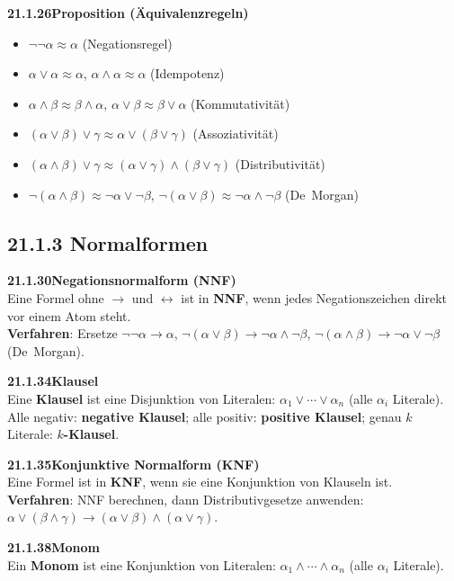 \documentclass[a4paper,12pt]{article}
\newcommand{\gentry}[3]{%
  \noindent\textbf{#1\quad #2}\nopagebreak\\[0.2em]
  #3\par\smallskip
}
\begin{document}
\gentry{21.1.26}{Proposition (Äquivalenzregeln)}{%
  \begin{itemize}[topsep=2pt,itemsep=1pt]
    \item $\lnot\lnot\alpha \approx \alpha$ \hfill (Negationsregel)
    \item $\alpha \lor \alpha \approx \alpha$,\; $\alpha \land \alpha \approx \alpha$ \hfill (Idempotenz)
    \item $\alpha \land \beta \approx \beta \land \alpha$,\;
          $\alpha \lor \beta \approx \beta \lor \alpha$ \hfill (Kommutativität)
    \item $(\alpha \lor \beta) \lor \gamma \approx \alpha \lor (\beta \lor \gamma)$ \hfill (Assoziativität)
    \item $(\alpha \land \beta) \lor \gamma \approx (\alpha \lor \gamma) \land (\beta \lor \gamma)$ \hfill (Distributivität)
    \item $\lnot(\alpha \land \beta) \approx \lnot\alpha \lor \lnot\beta$,\;
          $\lnot(\alpha \lor \beta) \approx \lnot\alpha \land \lnot\beta$ \hfill (De~Morgan)
  \end{itemize}
}

\subsection*{21.1.3 Normalformen}

\gentry{21.1.30}{Negationsnormalform (NNF)}{%
  Eine Formel ohne $\to$ und $\leftrightarrow$ ist in \textbf{NNF}, wenn jedes
  Negationszeichen direkt vor einem Atom steht.\\
  \textbf{Verfahren}: Ersetze $\lnot\lnot\alpha \to \alpha$,
  $\lnot(\alpha \lor \beta) \to \lnot\alpha \land \lnot\beta$,
  $\lnot(\alpha \land \beta) \to \lnot\alpha \lor \lnot\beta$ (De~Morgan).
}

\gentry{21.1.34}{Klausel}{%
  Eine \textbf{Klausel} ist eine Disjunktion von Literalen:
  $\alpha_1 \lor \cdots \lor \alpha_n$ (alle $\alpha_i$ Literale).
  Alle negativ: \textbf{negative Klausel};
  alle positiv: \textbf{positive Klausel};
  genau $k$ Literale: \textbf{$k$-Klausel}.
}

\gentry{21.1.35}{Konjunktive Normalform (KNF)}{%
  Eine Formel ist in \textbf{KNF}, wenn sie eine Konjunktion von Klauseln ist.\\
  \textbf{Verfahren}: NNF berechnen, dann Distributivgesetze anwenden:
  $\alpha \lor (\beta \land \gamma) \to (\alpha \lor \beta) \land (\alpha \lor \gamma)$.
}

\gentry{21.1.38}{Monom}{%
  Ein \textbf{Monom} ist eine Konjunktion von Literalen:
  $\alpha_1 \land \cdots \land \alpha_n$ (alle $\alpha_i$ Literale).
}
\end{document}
